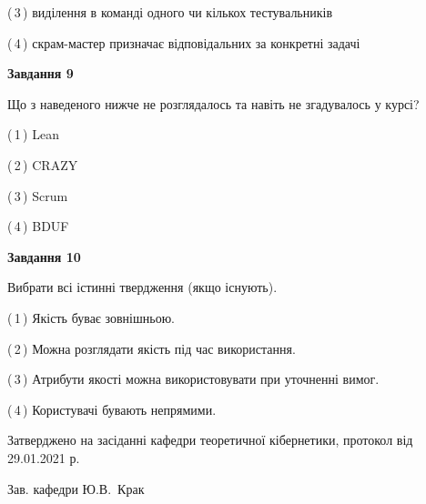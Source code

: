 \documentclass[10pt, ukrainian]{article}
\begin{document}
{\begin {large}
(\,3\,) виділення в команді одного чи кількох тестувальників%



(\,4\,) скрам-мастер призначає відповідальних за конкретні задачі%


{\begin {center}\textbf{Завдання 9}\end {center}}\par
Що з наведеного нижче не розглядалось та навіть не згадувалось у курсі?\par
\vspace{2mm}



(\,1\,) Lean%



(\,2\,) CRAZY%



(\,3\,) Scrum%



(\,4\,) BDUF%


{\begin {center}\textbf{Завдання 10}\end {center}}\par
Вибрати всі істинні твердження (якщо існують).\par
\vspace{2mm}



(\,1\,) Якість буває зовнішньою.%



(\,2\,) Можна розглядати якість під час використання.%



(\,3\,) Атрибути якості можна використовувати при уточненні вимог.%



(\,4\,) Користувачі бувають непрямими.%



\end {large}}
{\vspace{5mm}\smallskip \begin {small} Затверджено на засіданні кафедри теоретичної кібернетики, протокол  від   29.01.2021 р.\par\smallskip\smallskip
{\parbox {6.5 cm}{Зав. кафедри \dotfill Ю.В.~Крак}} \end{small}}
\newpage
\end{document}
